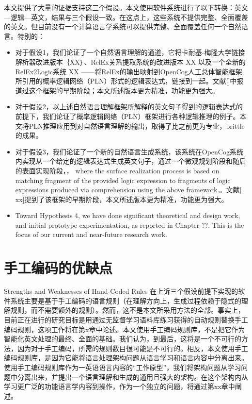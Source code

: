 本文提供了大量的证据支持这三个假设。本文使用软件系统进行了以下转换：英文—逻辑—英文，结果与三个假设一致。在这点上，这些系统不提供完整、全面覆盖的英文。但目前没有一个计算语言学系统可以提供完整、全面覆盖任何一个自然语言。特别的：
\begin{itemize}
\item 对于假设1，我们论证了一个自然语言理解的通道，它将卡耐基-梅隆大学链接解析器改进版本｛XX｝、RelEx关系提取系统的改进版本{ XX }以及一个全新的RelEx2Logic系统{ XX }——将RelEx的输出映射到OpenCog人工总体智能框架所引用的概率逻辑网络（PLN）形式的逻辑表达式，链接到一起。文献[]中报道过这个框架的早期阶段；本文所述版本更为精准，功能更为强大。
\item 对于假设2，以上述自然语言理解框架所解释的英文句子得到的逻辑表达式的前提下，我们论证了概率逻辑网络（PLN）框架进行各种逻辑推理的例子。本文将PLN推理应用到对自然语言理解的输出，取得了比之前更为专业，brittle的成果。
\item 对于假设3，我们论证了一个新的自然语言生成系统，该系统在OpenCog系统内实现从一个给定的逻辑表达式生成英文句子，通过一个微观规划阶段和随后的表面实现阶段，， where the surface realization process is based on matching fragment of the provided logic expression to fragments of logic expressions produced via comprehension using the above framework.。文献[ xx]提到了该框架的早期阶段，本文所述版本更为精准，功能更为强大。
\item Toward Hypothesis 4, we have done signiﬁcant theoretical and design work, and initial prototype experimentation, as reported in Chapter ??. This is the focus of our current and near-future research work.
\end{itemize}

\section{手工编码的优缺点}{Strengths and Weaknesses of Hand-Coded Rules}
在上诉三个假设前提下实现的软件系统主要是基于手工编码的语言规则（在理解方向上，生成过程依赖于隐式的理解规则，而不需要额外的规则）。然而，这不是本文所采用方法的全部。事实上，目前正在进行的研究目标是用通过无监督学习语料库练习获得的自动规则替换手工编码规则，这项工作将在第x章中论述。本文使用手工编码规则库，不是把它作为智能化英文处理的最终、全面的基础。我们认为，到最后，这将是一个不可行的方法，因为对于手工编码，所需的规则数目很可能是不可行的。相反，本文使用手工编码规则库，是因为它能将语言处理架构问题从语言学习和语言内容中分离出来。使用手工编码规则库作为一英语语言内容的“工作原型”，我们将架构问题从学习问题中分离出来，并提出一个语言理解和生成的通用且强大的架构。在这个架构内从学习更广泛的功能语言学内容到操作，作为一个独立的问题，将通过第xx章中阐述。

